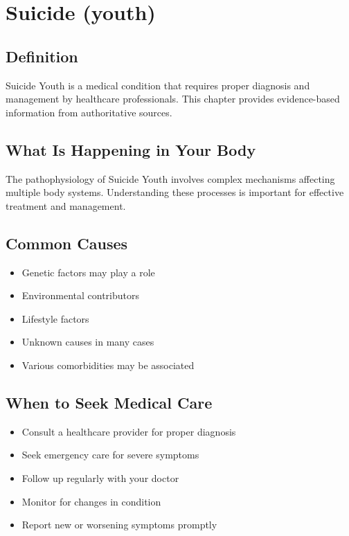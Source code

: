 
\chapter{Suicide (youth)}

\section*{Definition}
Suicide Youth is a medical condition that requires proper diagnosis and management by healthcare professionals. This chapter provides evidence-based information from authoritative sources.

\section*{What Is Happening in Your Body}
The pathophysiology of Suicide Youth involves complex mechanisms affecting multiple body systems. Understanding these processes is important for effective treatment and management.

\section*{Common Causes}
\begin{itemize}
  \item Genetic factors may play a role
  \item Environmental contributors
  \item Lifestyle factors
  \item Unknown causes in many cases
  \item Various comorbidities may be associated
\end{itemize}

\section*{When to Seek Medical Care}
\begin{itemize}
  \item Consult a healthcare provider for proper diagnosis
  \item Seek emergency care for severe symptoms
  \item Follow up regularly with your doctor
  \item Monitor for changes in condition
  \item Report new or worsening symptoms promptly
\end{itemize}

